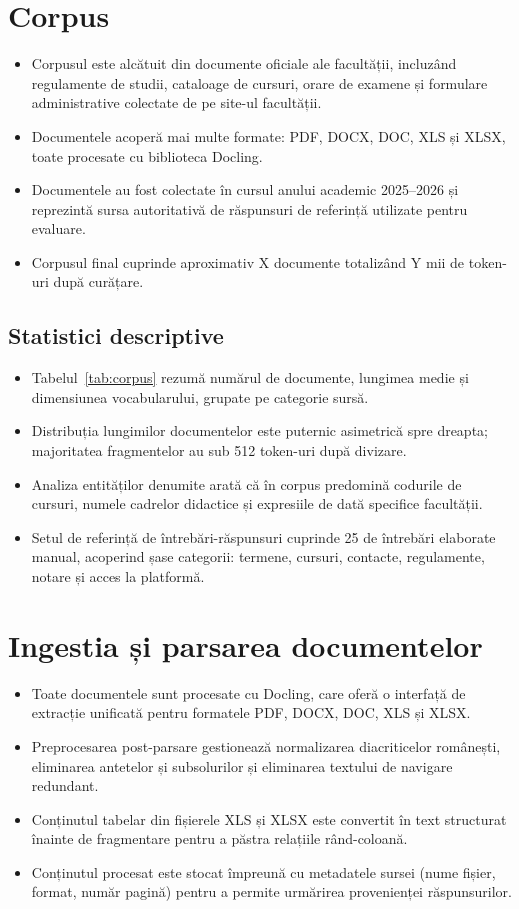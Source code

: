 \documentclass[12pt,a4paper]{report}
\begin{document}
\section{Corpus}
\begin{itemize}
    \item Corpusul este alcătuit din documente oficiale ale facultății, incluzând regulamente de studii, cataloage de cursuri, orare de examene și formulare administrative colectate de pe site-ul facultății.
    \item Documentele acoperă mai multe formate: PDF, DOCX, DOC, XLS și XLSX, toate procesate cu biblioteca Docling.
    \item Documentele au fost colectate în cursul anului academic 2025--2026 și reprezintă sursa autoritativă de răspunsuri de referință utilizate pentru evaluare.
    \item Corpusul final cuprinde aproximativ X documente totalizând Y mii de token-uri după curățare.
\end{itemize}

\subsection{Statistici descriptive}
\begin{itemize}
    \item Tabelul~\ref{tab:corpus} rezumă numărul de documente, lungimea medie și dimensiunea vocabularului, grupate pe categorie sursă.
    \item Distribuția lungimilor documentelor este puternic asimetrică spre dreapta; majoritatea fragmentelor au sub 512 token-uri după divizare.
    \item Analiza entităților denumite arată că în corpus predomină codurile de cursuri, numele cadrelor didactice și expresiile de dată specifice facultății.
    \item Setul de referință de întrebări-răspunsuri cuprinde 25 de întrebări elaborate manual, acoperind șase categorii: termene, cursuri, contacte, regulamente, notare și acces la platformă.
\end{itemize}

\section{Ingestia și parsarea documentelor}
\begin{itemize}
    \item Toate documentele sunt procesate cu Docling, care oferă o interfață de extracție unificată pentru formatele PDF, DOCX, DOC, XLS și XLSX.
    \item Preprocesarea post-parsare gestionează normalizarea diacriticelor românești, eliminarea antetelor și subsolurilor și eliminarea textului de navigare redundant.
    \item Conținutul tabelar din fișierele XLS și XLSX este convertit în text structurat înainte de fragmentare pentru a păstra relațiile rând-coloană.
    \item Conținutul procesat este stocat împreună cu metadatele sursei (nume fișier, format, număr pagină) pentru a permite urmărirea provenienței răspunsurilor.
\end{itemize}
\end{document}
